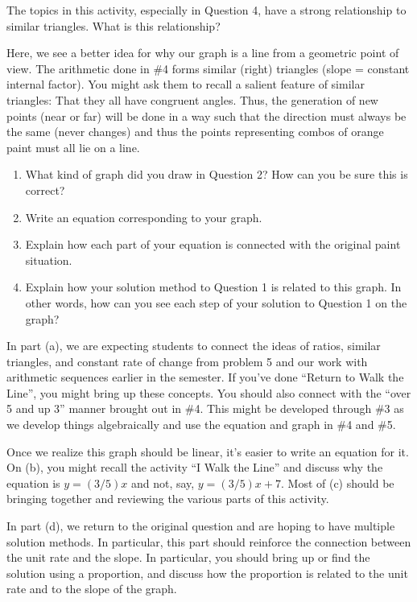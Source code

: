 \documentclass[nooutcomes, handout]{ximera}
\begin{document}
\begin{question}
The topics in this activity, especially in Question 4, have a strong relationship to similar triangles.  What is this relationship?

\begin{instructorNotes}
Here, we see a better idea for why our graph is a line from a geometric point of view.  The arithmetic done in \#4 forms similar (right) triangles (slope = constant internal factor).  You might ask them to recall a salient feature of similar triangles: That they all have congruent angles.  Thus, the generation of new points (near or far) will be done in a way such that the direction must always be the same (never changes) and thus the points representing combos of orange paint must all lie on a line.
\end{instructorNotes}
\end{question}



\begin{question}
\begin{enumerate}
    \item What kind of graph did you draw in Question 2?  How can you be sure this is correct?
    \item Write an equation corresponding to your graph.
    \item Explain how each part of your equation is connected with the original paint situation.
    \item Explain how your solution method to Question 1 is related to this graph.  In other words, how can you see each step of your solution to Question 1 on the graph?
\end{enumerate}

\begin{instructorNotes}
In part (a), we are expecting students to connect the ideas of ratios, similar triangles, and constant rate of change from problem 5 and our work with arithmetic sequences earlier in the semester.  If you've done ``Return to Walk the Line'', you might bring up these concepts.  You should also connect with the ``over 5 and up 3'' manner brought out in \#4.  This might be developed through \#3 as we develop things algebraically and use the equation and graph in \#4 and \#5.

Once we realize this graph should be linear, it's easier to write an equation for it.  On (b), you might recall the activity ``I Walk the Line'' and discuss why the equation is $y = (3/5)x$ and not, say, $y = (3/5)x + 7$.  Most of (c) should be bringing together and reviewing the various parts of this activity.

In part (d), we return to the original question and are hoping to have multiple solution methods.  In particular, this part should reinforce the connection between the unit rate and the slope.  In particular, you should bring up or find the solution using a proportion, and discuss how the proportion is related to the unit rate and to the slope of the graph.
\end{instructorNotes}

\end{question}
\end{document}
